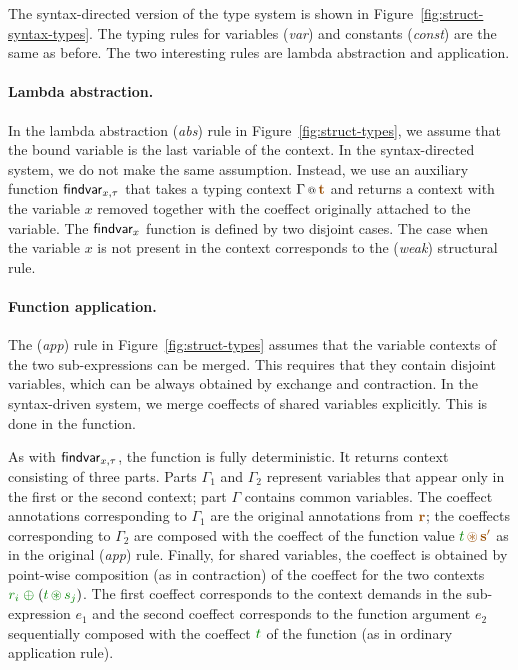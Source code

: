 The syntax-directed version of the type system is shown in Figure~\ref{fig:struct-syntax-types}.
The typing rules for variables (\emph{var}) and constants (\emph{const}) are the same as before.
The two interesting rules are lambda abstraction and application.

\paragraph{Lambda abstraction.}
In the lambda abstraction (\emph{abs}) rule in Figure~\ref{fig:struct-types}, we assume that the bound
variable is the last variable of the context. In the syntax-directed system, we do not make the
same assumption. Instead, we use an auxiliary function $\textnormal{\sffamily findvar}_{x,\tau}$ that takes a typing
context $\coctx{\Gamma}{\aclrd{\textbf{t}}}$ and returns a context with the variable $x$ removed
together with the coeffect originally attached to the variable. The $\textnormal{\sffamily findvar}_x$ function is
defined by two disjoint cases. The case when the variable $x$ is not present in the context
corresponds to the (\emph{weak}) structural rule.

\paragraph{Function application.} The (\emph{app}) rule in Figure~\ref{fig:struct-types}
assumes that the variable contexts of the two sub-expressions can be merged. This requires that they
contain disjoint variables, which can be always obtained by exchange and contraction. In the
syntax-driven system, we merge coeffects of shared variables explicitly. This is done in the
 function.

As with $\textnormal{\sffamily findvar}_{x,\tau}$, the  function is fully deterministic.
It returns context consisting of three parts. Parts $\Gamma_1$
and $\Gamma_2$ represent variables that appear only in the first or the second context; part
$\Gamma$ contains common variables. The coeffect annotations corresponding to $\Gamma_1$ are
the original annotations from $\aclrd{\textbf{r}}$; the coeffects corresponding to $\Gamma_2$
are composed with the coeffect of the function value $\cclrd{t} \,\aseq\, \aclrd{\textbf{s}'}$
as in the original (\emph{app}) rule. Finally, for shared variables, the coeffect is
obtained by point-wise composition (as in contraction) of the coeffect for the two contexts
$\cclrd{r_i} \;\cpar\; (\cclrd{t} \,\cseq\, \cclrd{s_j})$. The first coeffect corresponds to the
context demands in the sub-expression $e_1$ and the second coeffect corresponds to the
function argument $e_2$ sequentially composed with the coeffect $\cclrd{t}$ of the function
(as in ordinary application rule).


